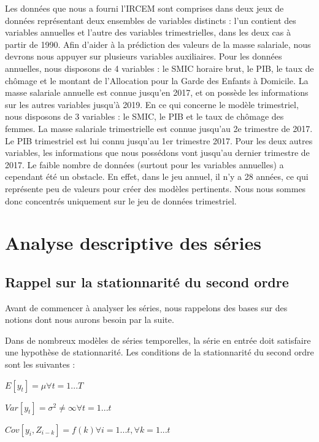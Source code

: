 \documentclass[11pt,]{article}
\begin{document}
Les données que nous a fourni l'IRCEM sont comprises dans deux jeux de
données représentant deux ensembles de variables distincts : l'un
contient des variables annuelles et l'autre des variables
trimestrielles, dans les deux cas à partir de 1990. Afin d'aider à la
prédiction des valeurs de la masse salariale, nous devrons nous appuyer
sur plusieurs variables auxiliaires. Pour les données annuelles, nous
disposons de 4 variables : le SMIC horaire brut, le PIB, le taux de
chômage et le montant de l'Allocation pour la Garde des Enfants à
Domicile. La masse salariale annuelle est connue jusqu'en 2017, et on
possède les informations sur les autres variables jusqu'à 2019. En ce
qui concerne le modèle trimestriel, nous disposons de 3 variables : le
SMIC, le PIB et le taux de chômage des femmes. La masse salariale
trimestrielle est connue jusqu'au 2e trimestre de 2017. Le PIB
trimestriel est lui connu jusqu'au 1er trimestre 2017. Pour les deux
autres variables, les informations que nous possédons vont jusqu'au
dernier trimestre de 2017. Le faible nombre de données (surtout pour les
variables annuelles) a cependant été un obstacle. En effet, dans le jeu
annuel, il n'y a 28 années, ce qui représente peu de valeurs pour créer
des modèles pertinents. Nous nous sommes donc concentrés uniquement sur
le jeu de données trimestriel.

\newpage

\section{Analyse descriptive des
séries}\label{analyse-descriptive-des-series}

\subsection{Rappel sur la stationnarité du second
ordre}\label{rappel-sur-la-stationnarite-du-second-ordre}

Avant de commencer à analyser les séries, nous rappelons des bases sur
des notions dont nous aurons besoin par la suite.

Dans de nombreux modèles de séries temporelles, la série en entrée doit
satisfaire une hypothèse de stationnarité. Les conditions de la
stationnarité du second ordre sont les suivantes :

\(E[y_{t}]=\mu \forall t=1...T\)

\(Var[y_{t}]=\sigma ^{2}\neq \infty \forall t=1...t\)

\(Cov[y_{i},Z_{i-k}]=f(k) \forall i=1...t, \forall k=1...t\)
\end{document}
